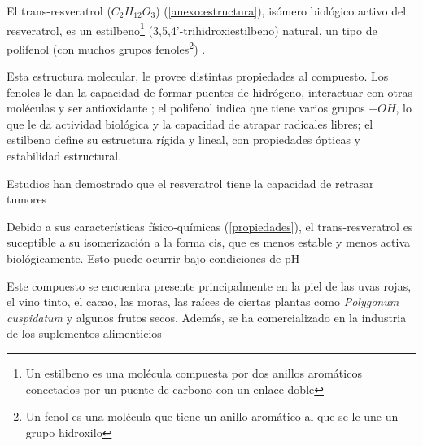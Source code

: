 El trans-resveratrol ($C_2H_12O_3$) (\ref{anexo:estructura}), isómero biológico activo del resveratrol,
 es un estilbeno\footnote{Un estilbeno es una molécula compuesta por dos anillos aromáticos conectados por un puente de carbono con un enlace doble} 
 (3,5,4'-trihidroxiestilbeno) natural,
un tipo de polifenol (con muchos grupos fenoles\footnote{Un fenol es una molécula que tiene un anillo aromático al que se le une un grupo hidroxilo})
\parencite{trans-resveratrol}.

Esta estructura molecular, le provee distintas propiedades al compuesto. Los fenoles le dan la capacidad
de formar puentes de hidrógeno, interactuar con otras moléculas y ser antioxidante \parencite{polifenolantioxidante};
el polifenol indica que tiene varios grupos $-OH$, lo que le da actividad biológica y la capacidad de
atrapar radicales libres; el estilbeno define su estructura rígida y lineal, con propiedades ópticas
y estabilidad estructural.

Estudios han demostrado que el resveratrol tiene la capacidad de retrasar tumores
\parencite{actividadbiologicaresveratrol}

Debido a sus características físico-químicas (\ref{propiedades}),
el trans-resveratrol es suceptible a su isomerización
a la forma cis, que es menos estable y menos activa biológicamente.
Esto puede ocurrir bajo condiciones de pH 

Este compuesto se encuentra presente principalmente en la piel de las uvas rojas,
el vino tinto, el cacao, las moras, las raíces de ciertas plantas como \textit{Polygonum cuspidatum}
 y algunos frutos secos. Además, se ha comercializado en la industria de los suplementos
 alimenticios